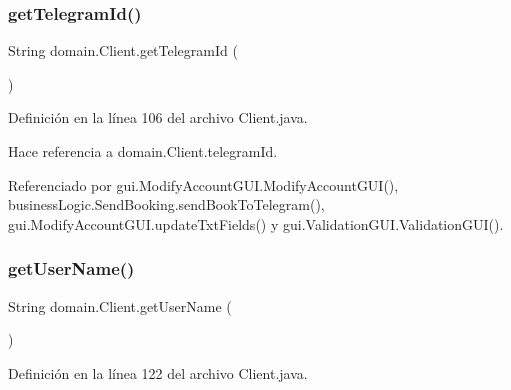 \subsubsection{\texorpdfstring{getTelegramId()}{getTelegramId()}}
{\footnotesize\ttfamily String domain.\+Client.\+get\+Telegram\+Id (\begin{DoxyParamCaption}{ }\end{DoxyParamCaption})}



Definición en la línea 106 del archivo Client.\+java.


\begin{DoxyCode}{0}

\end{DoxyCode}


Hace referencia a domain.\+Client.\+telegram\+Id.



Referenciado por gui.\+Modify\+Account\+G\+U\+I.\+Modify\+Account\+G\+U\+I(), business\+Logic.\+Send\+Booking.\+send\+Book\+To\+Telegram(), gui.\+Modify\+Account\+G\+U\+I.\+update\+Txt\+Fields() y gui.\+Validation\+G\+U\+I.\+Validation\+G\+U\+I().

\mbox{\label{classdomain_1_1_client_aa3cb01ad1be8a3ad758ef94bbf60c69c}} 
\subsubsection{\texorpdfstring{getUserName()}{getUserName()}}
{\footnotesize\ttfamily String domain.\+Client.\+get\+User\+Name (\begin{DoxyParamCaption}{ }\end{DoxyParamCaption})}



Definición en la línea 122 del archivo Client.\+java.


\begin{DoxyCode}{0}

\end{DoxyCode}


